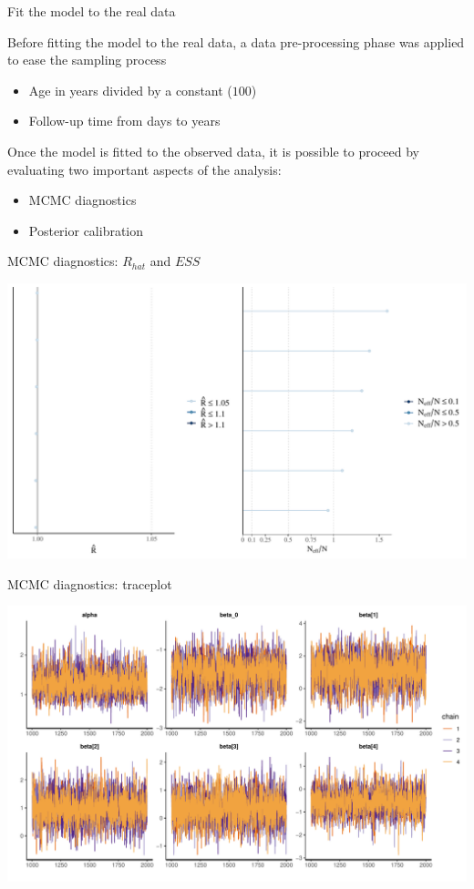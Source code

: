 \documentclass[ignorenonframetext,a4paper]{beamer}
\begin{document}
\begin{frame}{Fit the model to the real data}

Before fitting the model to the real data, a data pre-processing phase
was applied to ease the sampling process

\begin{itemize}
  \item{Age in years divided by a constant ($100$)}
  \item{Follow-up time from days to years}
\end{itemize}

Once the model is fitted to the observed data, it is possible to proceed
by evaluating two important aspects of the analysis:

\begin{itemize}
  \item{MCMC diagnostics}
  \item{Posterior calibration}
\end{itemize}

\end{frame}

\begin{frame}{MCMC diagnostics: \(R_{hat}\) and \(ESS\)}

\includegraphics{DB_presentation_case_study_files/figure-beamer/unnamed-chunk-12-1.pdf}

\end{frame}

\begin{frame}{MCMC diagnostics: traceplot}

\includegraphics{DB_presentation_case_study_files/figure-beamer/unnamed-chunk-13-1.pdf}

\end{frame}
\end{document}
